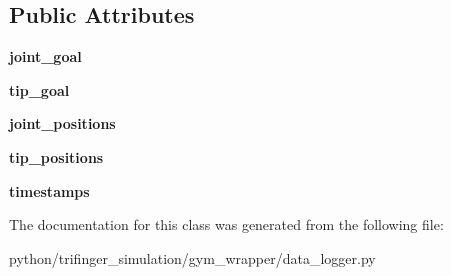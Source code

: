 \subsection*{Public Attributes}
\begin{DoxyCompactItemize}
\item 
\mbox{\label{classtrifinger__simulation_1_1gym__wrapper_1_1data__logger_1_1EpisodeData_a202f68a21b4e57bf292a8fbb67fcb4a6}} 
{\bfseries joint\+\_\+goal}
\item 
\mbox{\label{classtrifinger__simulation_1_1gym__wrapper_1_1data__logger_1_1EpisodeData_a4b0d1e86244d42540cf1564ffbaf0086}} 
{\bfseries tip\+\_\+goal}
\item 
\mbox{\label{classtrifinger__simulation_1_1gym__wrapper_1_1data__logger_1_1EpisodeData_a221bc67e1473d1b5becff014b2914ffe}} 
{\bfseries joint\+\_\+positions}
\item 
\mbox{\label{classtrifinger__simulation_1_1gym__wrapper_1_1data__logger_1_1EpisodeData_a3d6a04f83f862d48be0e9b2500d5000c}} 
{\bfseries tip\+\_\+positions}
\item 
\mbox{\label{classtrifinger__simulation_1_1gym__wrapper_1_1data__logger_1_1EpisodeData_a7cebf91d27c7060d8eccb2c975f368e7}} 
{\bfseries timestamps}
\end{DoxyCompactItemize}


The documentation for this class was generated from the following file\+:\begin{DoxyCompactItemize}
\item 
python/trifinger\+\_\+simulation/gym\+\_\+wrapper/data\+\_\+logger.\+py\end{DoxyCompactItemize}
